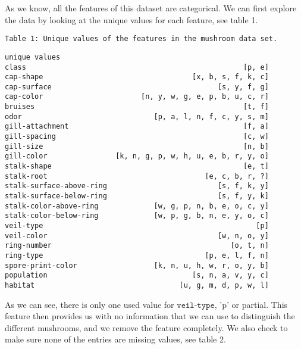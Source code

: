 \documentclass[11pt]{article}
\makeatletter
\newcommand{\boxspacing}{\kern\kvtcb@left@rule\kern\kvtcb@boxsep}
\makeatother
\begin{document}
    As we know, all the features of this dataset are categorical. We can
first explore the data by looking at the unique values for each feature,
see table 1.

    \begin{Verbatim}[commandchars=\\\{\}]
Table 1: Unique values of the features in the mushroom data set.
    \end{Verbatim}

            \begin{tcolorbox}[breakable, size=fbox, boxrule=.5pt, pad at break*=1mm, opacityfill=0]
{\boxspacing}
\begin{Verbatim}[commandchars=\\\{\}]
                                                 unique values  
class                                                   [p, e]
cap-shape                                   [x, b, s, f, k, c]
cap-surface                                       [s, y, f, g]
cap-color                       [n, y, w, g, e, p, b, u, c, r]
bruises                                                 [t, f]
odor                               [p, a, l, n, f, c, y, s, m]
gill-attachment                                         [f, a]
gill-spacing                                            [c, w]
gill-size                                               [n, b]
gill-color                [k, n, g, p, w, h, u, e, b, r, y, o]
stalk-shape                                             [e, t]
stalk-root                                     [e, c, b, r, ?]
stalk-surface-above-ring                          [s, f, k, y]
stalk-surface-below-ring                          [s, f, y, k]
stalk-color-above-ring             [w, g, p, n, b, e, o, c, y]
stalk-color-below-ring             [w, p, g, b, n, e, y, o, c]
veil-type                                                  [p]
veil-color                                        [w, n, o, y]
ring-number                                          [o, t, n]
ring-type                                      [p, e, l, f, n]
spore-print-color                  [k, n, u, h, w, r, o, y, b]
population                                  [s, n, a, v, y, c]
habitat                                  [u, g, m, d, p, w, l]
\end{Verbatim}
\end{tcolorbox}
        
    As we can see, there is only one used value for $\texttt{veil-type}$, 'p' or
partial. This feature then provides us with no information that we can
use to distinguish the different mushrooms, and we remove the feature
completely. We also check to make sure none of the entries are missing
values, see table 2.
\end{document}
